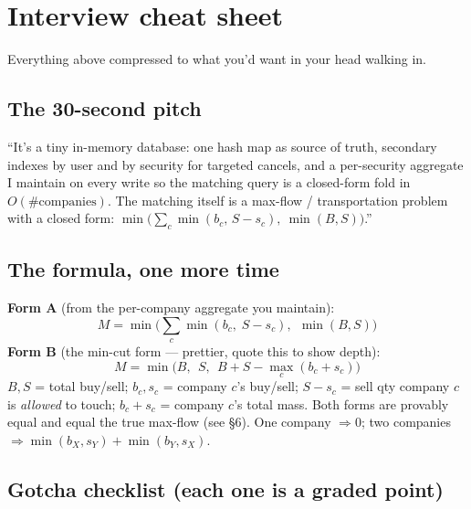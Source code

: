 \section{Interview cheat sheet}

Everything above compressed to what you'd want in your head walking in.

\subsection{The 30-second pitch}

\begin{keybox}
``It's a tiny in-memory database: one hash map as source of truth, secondary
indexes by user and by security for targeted cancels, and a per-security
aggregate I maintain on every write so the matching query is a closed-form fold in
$O(\#\text{companies})$. The matching itself is a max-flow / transportation
problem with a closed form:
$\min\!\big(\sum_c \min(b_c,\,S-s_c),\ \min(B,S)\big)$.''
\end{keybox}

\subsection{The formula, one more time}

\textbf{Form A} (from the per-company aggregate you maintain):
\[
M=\min\!\Big(\sum_{c}\min(b_c,\;S-s_c),\ \ \min(B,S)\Big)
\]
\textbf{Form B} (the min-cut form --- prettier, quote this to show depth):
\[
M=\min\!\Big(B,\ \ S,\ \ B+S-\max_c(b_c+s_c)\Big)
\]
$B,S$ = total buy/sell; $b_c,s_c$ = company $c$'s buy/sell; $S-s_c$ = sell qty
company $c$ is \emph{allowed} to touch; $b_c+s_c$ = company $c$'s total mass. Both
forms are provably equal and equal the true max-flow (see \S6). One company
$\Rightarrow 0$; two companies $\Rightarrow \min(b_X,s_Y)+\min(b_Y,s_X)$.

\subsection{Gotcha checklist (each one is a graded point)}

